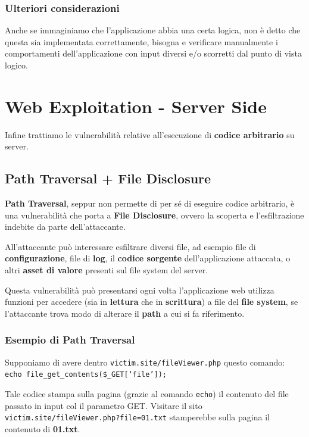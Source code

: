 \documentclass{article}
\begin{document}
\subsubsection{Ulteriori considerazioni}
Anche se immaginiamo che l’applicazione abbia una certa logica, non è detto che questa sia implementata correttamente, bisogna e verificare manualmente i comportamenti dell’applicazione con input diversi e/o scorretti dal punto di vista logico.

\newpage

\section{Web Exploitation - Server Side}
Infine trattiamo le vulnerabilità relative all'esecuzione di \textbf{codice arbitrario} su server.

\subsection{Path Traversal + File Disclosure}
\textbf{Path Traversal}, seppur non permette di per sé di eseguire codice arbitrario, è una vulnerabilità che porta a \textbf{File Disclosure}, ovvero la scoperta e l'esfiltrazione indebite da
parte dell’attaccante.

All’attaccante può interessare esfiltrare diversi file, ad esempio file di \textbf{configurazione}, file di \textbf{log}, il \textbf{codice sorgente} dell’applicazione attaccata, o altri \textbf{asset di valore} presenti sul file system del server.

Questa vulnerabilità può presentarsi ogni volta l'applicazione web utilizza funzioni per accedere (sia in \textbf{lettura} che in \textbf{scrittura}) a file del \textbf{file system}, se l'attaccante trova modo di alterare il \textbf{path} a cui si fa riferimento.

\subsubsection{Esempio di Path Traversal}
Supponiamo di avere dentro \verb|victim.site/fileViewer.php| questo comando:\\
\verb|echo file_get_contents($_GET[‘file’]);| 

Tale codice stampa sulla pagina (grazie al comando \verb|echo|) il contenuto del file passato in input col il parametro GET. Visitare il sito \verb|victim.site/fileViewer.php?file=01.txt| stamperebbe sulla pagina il contenuto di \textbf{01.txt}.
\end{document}
